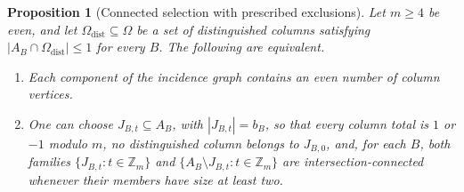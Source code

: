 \documentclass[10pt,a4paper]{amsart}
\newtheorem{proposition}[theorem]{Proposition}
\newcommand{\Zm}{\mathbb Z_m}
\newcommand{\cO}{\Omega}
\begin{document}
\begin{proposition}[Connected selection with prescribed exclusions]\label{prop:pinned-selection}
Let $m\ge4$ be even, and let $\cO_\mathrm{dist}\subseteq\cO$ be a set of
distinguished columns satisfying
$|A_B\cap\cO_\mathrm{dist}|\le1$ for every $B$. The following are equivalent.
\begin{enumerate}
\item Each component of the incidence graph contains an even number of column
vertices.
\item One can choose $J_{B,t}\subseteq A_B$, with $|J_{B,t}|=b_B$, so that every
column total is $1$ or $-1$ modulo $m$, no distinguished column belongs to $J_{B,0}$,
and, for each $B$, both families
$\{J_{B,t}:t\in\Zm\}$ and $\{A_B\setminus J_{B,t}:t\in\Zm\}$ are
intersection-connected whenever their members have size at least two.
\end{enumerate}
\end{proposition}
\end{document}
